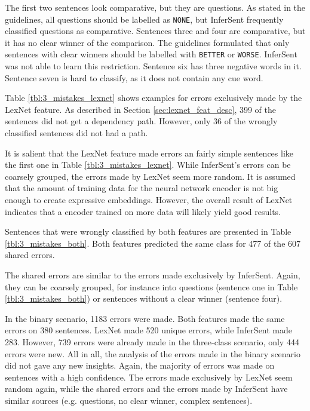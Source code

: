 The first two sentences look comparative, but they are questions. As stated in the guidelines, all questions should be labelled as \texttt{NONE}, but InferSent frequently classified questions as comparative. Sentences three and four are comparative, but it has no clear winner of the comparison. The guidelines formulated that only sentences with clear winners should be labelled with \texttt{BETTER} or \texttt{WORSE}. InferSent was not able to learn this restriction. Sentence six has three negative words in it. Sentence seven is hard to classify, as it does not contain any cue word.

Table \ref{tbl:3_mistakes_lexnet} shows examples for errors exclusively made by the LexNet feature. As described in Section \ref{sec:lexnet_feat_desc}, 399 of the sentences did not get a dependency path. However, only 36 of the wrongly classified sentences did not had a path.

It is salient that the LexNet feature made errors an fairly simple sentences like the first one in Table \ref{tbl:3_mistakes_lexnet}. While InferSent's errors can be coarsely grouped, the errors made by LexNet seem more random. It is assumed that the amount of training data for the neural network encoder is not big enough to create expressive embeddings. However, the overall result of LexNet indicates that a encoder trained on more data will likely yield good results.

Sentences that were wrongly classified by both features are presented in Table \ref{tbl:3_mistakes_both}. Both features predicted the same class for 477 of the 607 shared errors.

The shared errors are similar to the errors made exclusively by InferSent. Again, they can be coarsely grouped, for instance into questions (sentence one in Table \ref{tbl:3_mistakes_both}) or sentences without a clear winner (sentence four).\newline

In the binary scenario, 1183 errors were made. Both features made the same errors on 380 sentences. LexNet made 520 unique errors, while InferSent made 283. However, 739 errors were already made in the three-class scenario, only 444 errors were new. All in all, the analysis of the errors made in the binary scenario did not gave any new insights. Again, the majority of errors was made on sentences with a high confidence. The errors made exclusively by LexNet seem random again, while the shared errors and the errors made by InferSent have similar sources (e.g. questions, no clear winner, complex sentences). %

